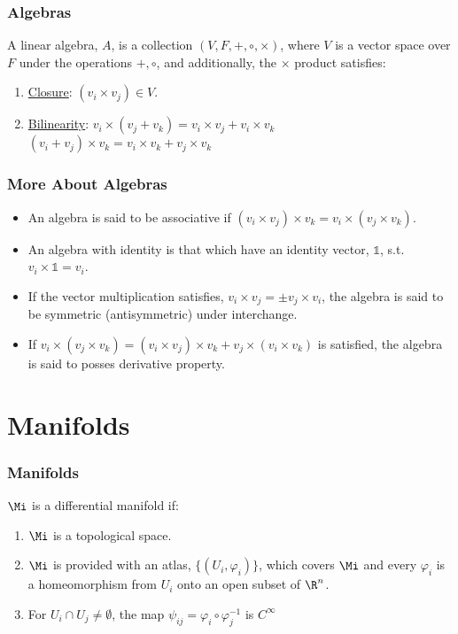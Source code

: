 \begin{frame}
  \frametitle{Algebras}

  \begin{definition}
    A \alert{linear algebra}, $A$, is a collection $(V,F,+,\circ,\times)$, where $V$ is a vector space over $F$ under the operations $+,\circ$, and additionally, the $\times$ product satisfies:
    \begin{enumerate}[I]
    \item \uline{Closure}: $(v_i\times v_j)\in V$.
    \item \uline{Bilinearity}: $v_i\times(v_j+v_k) = v_i\times v_j + v_i\times v_k $\\
      $(v_i+v_j)\times v_k = v_i\times v_k+v_j\times v_k$
    \end{enumerate}
  \end{definition}
\end{frame}

\begin{frame}
  \frametitle{More About Algebras}
  \begin{itemize}
  \item An algebra is said to be associative if $(v_i\times v_j)\times v_k = v_i\times (v_j\times v_k)$.
  \item An algebra with identity is that which have an identity vector, $\mathds{1}$, s.t. $ v_i\times\mathds{1} = v_i$.
  \item If the vector multiplication satisfies, $v_i\times v_j =\pm v_j\times v_i$, the algebra is  said to be symmetric (antisymmetric) under interchange.
  \item If $v_i\times (v_j\times v_k) = (v_i\times v_j)\times v_k + v_j\times (v_i\times v_k)$ is satisfied, the algebra is said to posses derivative property.
  \end{itemize}
\end{frame}


\section{Manifolds}

\begin{frame}
  \frametitle{Manifolds}

  \begin{definition}
    $\Mi$ is a differential manifold if:
    \begin{enumerate}[i]
    \item $\Mi$ is a topological space.
    \item $\Mi$ is provided with an atlas, $\{(U_i,\varphi_i)\}$, which covers $\Mi$ and every $\varphi_i$ is a homeomorphism from $U_i$ onto an open subset of $\R^n$.
    \item For $U_i\cap U_j\neq \emptyset$, the map $\psi_{ij}=\varphi_i\circ\varphi_j^{-1}$ is $C^\infty$
    \end{enumerate}
  \end{definition}
\end{frame}

